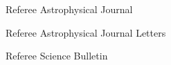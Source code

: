 




\begin{cventries}

\cvsimpentry
{Referee}
{Astrophysical Journal}
{}
{}

\cvsimpentry
{Referee}
{Astrophysical Journal Letters}
{}
{}

\cvsimpentry
{Referee}
{Science Bulletin}
{}
{}
\end{cventries}




